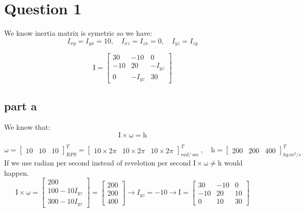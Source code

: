 \section{Question 1}
We know inertia matrix is symetric so we have:
$$I_{xy} = I_{yx} = 10, \quad I_{xz} = I_{zx} = 0, \quad I_{yz} = I_{zy}$$

$$\boldsymbol{\mathrm{I}} = \begin{bmatrix}
    30 & -10 & 0 \\
    -10 & 20 & -I_{yz}\\
    0 & -I_{yz} & 30
\end{bmatrix}$$
\subsection{part a}
We know that:
\begin{equation}
    \boldsymbol{\mathrm{I}} \times \boldsymbol{\mathrm{\omega}} = \boldsymbol{\mathrm{h}}
\end{equation}

$$
\boldsymbol{\mathrm{\omega}} = \begin{bmatrix}
    10 & 10 & 10
\end{bmatrix}^T_{RPS} = \begin{bmatrix}
    10\times2\pi & 10\times2\pi & 10\times2\pi
\end{bmatrix}^T_{rad/\sec}, \quad \boldsymbol{\mathrm{h}} = \begin{bmatrix}
    200 & 200 & 400
\end{bmatrix}^T_{kg.m^2/s}
$$
If we use radian per second instead of revelotion per second $\boldsymbol{\mathrm{I}} \times \boldsymbol {\mathrm{\omega}} \neq \boldsymbol{\mathrm{h}}$ would happen.
$$ 
\boldsymbol{\mathrm{I}} \times \boldsymbol{\mathrm{\omega}} = \begin{bmatrix}
    200
    \\
    100 - 10I_{yz} \\
    300 - 10I_{yz}
\end{bmatrix} = \begin{bmatrix}
    200\\
    200\\
    400
\end{bmatrix} \rightarrow I_{yz} = -10 \rightarrow 
\boldsymbol{\mathrm{I}} = \begin{bmatrix}
    30 & -10 & 0 \\
    -10 & 20 & 10\\
    0 & 10 & 30
\end{bmatrix}
$$

